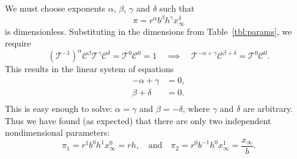 We must choose exponents $\alpha$, $\beta$, $\gamma$ and $\delta$
such that
\begin{equation}
   \pi = r^{\alpha} b^{\beta} h^{\gamma} x_{\infty}^{\delta}
\label{eqn:nondimparam}
\end{equation}
is dimensionless.  Substituting in the dimensions from 
Table~\ref{tbl:params}, we require
\begin{equation}
   \left(\mathcal{T}^{-1}\right)^{\alpha} \mathcal{C}^{\beta}
       \mathcal{T}^{\gamma} \mathcal{C}^{\delta} = \mathcal{T}^0\mathcal{C}^0 = 1
       \quad\implies\quad
       \mathcal{T}^{-\alpha+\gamma}\mathcal{C}^{\beta+\delta}
        = \mathcal{T}^{0}\mathcal{C}^{0}.
\end{equation}
This results in the linear system of equations
\begin{equation}
\begin{split}
   -\alpha + \gamma & = 0, \\
    \beta + \delta & = 0. \\
\label{eqn:pdd:linearsys}
\end{split}
\end{equation}
This is easy enough to solve: $\alpha = \gamma$ and $\beta = -\delta$,
where $\gamma$ and $\delta$ are arbitrary. 
Thus we have found (as expected) that there are only two
independent nondimensional parameters:
\begin{equation}
  \pi_1 = r^1 b^0 h^1 x_{\infty}^0 = rh, \quad \textrm{and}\quad
  \pi_2 = r^0 b^{-1} h^0 x_{\infty}^1 = \frac{x_{\infty}}{b}. 
\end{equation}

